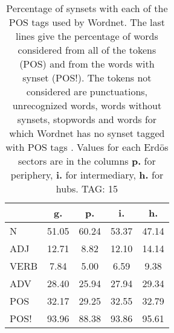\begin{table}[h!]
\begin{center}
\begin{tabular}{| l || c | c | c | c |}\hline
 & {\bf g.} & {\bf p.} & {\bf i.} & {\bf h.} \\\hline\hline
N & 51.05  & 60.24  & 53.37  & 47.14 \\\hline
ADJ & 12.71  & 8.82  & 12.10  & 14.14 \\\hline
VERB & 7.84  & 5.00  & 6.59  & 9.38 \\\hline
ADV & 28.40  & 25.94  & 27.94  & 29.34 \\\hline\hline
POS & 32.17  & 29.25  & 32.55  & 32.79 \\\hline
POS! & 93.96  & 88.38  & 93.86  & 95.61 \\\hline
\end{tabular}
\caption{Percentage of synsets with each of the POS tags used by Wordnet. The last lines give the percentage of words considered from all of the tokens (POS) and from the words with synset (POS!). The tokens not considered are punctuations, unrecognized words, words without synsets, stopwords and words for which Wordnet has no synset  tagged with POS tags . Values for each Erd\"os sectors are in the columns {{\bf p.}} for periphery, {{\bf i.}} for intermediary, {{\bf h.}} for hubs. TAG: 15}
\end{center}
\end{table}